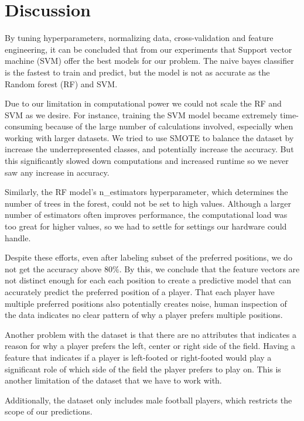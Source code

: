 \section{Discussion}

By tuning hyperparameters, normalizing data, cross-validation and feature engineering, it can be concluded that from our experiments that Support vector machine (SVM) offer the best models for our problem. The naive bayes classifier is the fastest to train and predict, but the model is not as accurate as the Random forest (RF) and SVM. 
\par
Due to our limitation in computational power we could not scale the RF and SVM as we desire. 
For instance, training the SVM model became extremely time-consuming because of the large number of calculations involved, especially when working with larger datasets. 
We tried to use SMOTE to balance the dataset by increase the underrepresented classes, and potentially increase the accuracy. But this significantly slowed down computations and increased runtime so we never saw any increase in accuracy.
\par
Similarly, the RF model's n\_estimators hyperparameter, which determines the number of trees in the forest, could not be set to high values. 
Although a larger number of estimators often improves performance, the computational load was too great for higher values, so we had to settle for settings our hardware could handle.
\par
Despite these efforts, even after labeling subset of the preferred positions, we do not get the accuracy above $80\%$. By this, we conclude that the feature vectors are not distinct enough for each each position to create a predictive model that can accurately predict the preferred position of a player. That each player have multiple preferred positions also potentially creates noise, human inspection of the data indicates no clear pattern of why a player prefers multiple positions.
\par
Another problem with the dataset is that there are no attributes that indicates a reason for why a player prefers the left, center or right side of the field. Having a feature that indicates if a player is left-footed or right-footed would play a significant role of which side of the field the player prefers to play on. This is another limitation of the dataset that we have to work with. 
\par 
Additionally, the dataset only includes male football players, which restricts the scope of our predictions.
